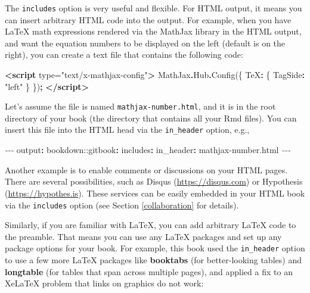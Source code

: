 \documentclass[
  12pt,
]{krantz}
\newenvironment{Shaded}{\begin{snugshade}}{\end{snugshade}}
\newcommand{\AttributeTok}[1]{\textcolor[rgb]{0.77,0.63,0.00}{#1}}
\newcommand{\DataTypeTok}[1]{\textcolor[rgb]{0.13,0.29,0.53}{#1}}
\newcommand{\FunctionTok}[1]{\textcolor[rgb]{0.00,0.00,0.00}{#1}}
\newcommand{\KeywordTok}[1]{\textcolor[rgb]{0.13,0.29,0.53}{\textbf{#1}}}
\newcommand{\NormalTok}[1]{#1}
\newcommand{\OperatorTok}[1]{\textcolor[rgb]{0.81,0.36,0.00}{\textbf{#1}}}
\newcommand{\OtherTok}[1]{\textcolor[rgb]{0.56,0.35,0.01}{#1}}
\newcommand{\PreprocessorTok}[1]{\textcolor[rgb]{0.56,0.35,0.01}{\textit{#1}}}
\newcommand{\StringTok}[1]{\textcolor[rgb]{0.31,0.60,0.02}{#1}}
\theoremstyle{definition}
\theoremstyle{definition}
\theoremstyle{definition}
\theoremstyle{definition}
\theoremstyle{remark}
\begin{document}
The \texttt{includes} option is very useful and flexible. For HTML output, it means you can insert arbitrary HTML code into the output. For example, when you have LaTeX math expressions rendered via the MathJax library in the HTML output, and want the equation numbers to be displayed on the left (default is on the right), you can create a text file that contains the following code:

\begin{Shaded}
\begin{Highlighting}[]
\KeywordTok{\textless{}script}\OtherTok{ type=}\StringTok{"text/x{-}mathjax{-}config"}\KeywordTok{\textgreater{}}
\NormalTok{MathJax}\OperatorTok{.}\AttributeTok{Hub}\OperatorTok{.}\FunctionTok{Config}\NormalTok{(\{}
  \DataTypeTok{TeX}\OperatorTok{:}\NormalTok{ \{ }\DataTypeTok{TagSide}\OperatorTok{:} \StringTok{"left"}\NormalTok{ \}}
\NormalTok{\})}\OperatorTok{;}
\KeywordTok{\textless{}/script\textgreater{}}
\end{Highlighting}
\end{Shaded}

Let's assume the file is named \texttt{mathjax-number.html}, and it is in the root directory of your book (the directory that contains all your Rmd files). You can insert this file into the HTML head via the \texttt{in\_header} option, e.g.,

\begin{Shaded}
\begin{Highlighting}[]
\PreprocessorTok{{-}{-}{-}}
\FunctionTok{output}\KeywordTok{:}
\AttributeTok{  bookdown:}\FunctionTok{:gitbook}\KeywordTok{:}
\AttributeTok{    }\FunctionTok{includes}\KeywordTok{:}
\AttributeTok{      }\FunctionTok{in\_header}\KeywordTok{:}\AttributeTok{ mathjax{-}number.html}
\PreprocessorTok{{-}{-}{-}}
\end{Highlighting}
\end{Shaded}

Another example is to enable comments or discussions on your HTML pages. There are several possibilities, such as Disqus (\url{https://disqus.com}) or Hypothesis (\url{https://hypothes.is}). These services can be easily embedded in your HTML book via the \texttt{includes} option (see Section \ref{collaboration} for details).

Similarly, if you are familiar with LaTeX, you can add arbitrary LaTeX code to the preamble. That means you can use any LaTeX packages and set up any package options for your book. For example, this book used the \texttt{in\_header} option to use a few more LaTeX packages like \textbf{booktabs} (for better-looking tables) and \textbf{longtable} (for tables that span across multiple pages), and applied a fix to an XeLaTeX problem that links on graphics do not work:
\end{document}
